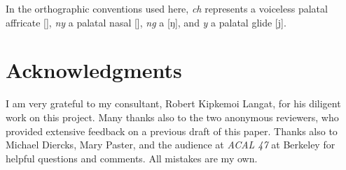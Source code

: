 \documentclass[output=paper,newtxmath,modfonts,nonflat,hidelinks]{langsci/langscibook}
\begin{document}
\medskip

\noindent
 In the orthographic conventions used here, \textit{ch} represents a voiceless palatal affricate [\textteshlig], \textit{ny} a palatal nasal [\textltailn], \textit{ng} a  [ŋ], and \textit{y} a palatal glide [j].   

\section*{Acknowledgments}
I am very grateful to my  consultant, Robert Kipkemoi Langat, for his diligent work on this project. Many thanks also to the two anonymous reviewers, who provided extensive feedback on a previous draft of this paper. Thanks also to Michael Diercks, Mary Paster, and the audience at \textit{ACAL 47} at Berkeley for helpful questions and comments. All mistakes are my own.

\sloppy
\printbibliography[heading=subbibliography,notkeyword=this]
\end{document}
